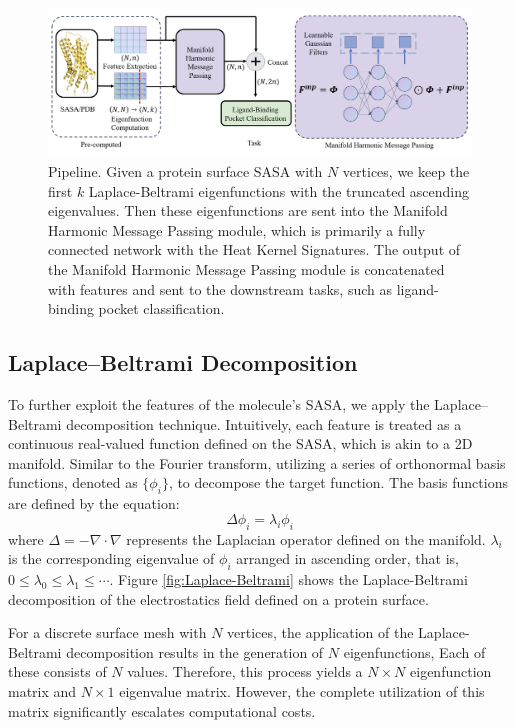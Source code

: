 \begin{figure}
    \centering
    \includegraphics[width=\linewidth]{figures/pipeline.jpg}
    \caption{
        Pipeline.
        Given a protein surface SASA with $N$ vertices, we keep the first $k$ Laplace-Beltrami eigenfunctions with the truncated ascending eigenvalues.
        Then these eigenfunctions are sent into the Manifold Harmonic Message Passing module, which is primarily a fully connected network with the Heat Kernel Signatures.
        The output of the Manifold Harmonic Message Passing module is concatenated with features and sent to the downstream tasks, such as ligand-binding pocket classification.
    }
    \label{fig:pipeline}
\end{figure}

\subsection{Laplace–Beltrami Decomposition}

To further exploit the features of the molecule's SASA, we apply the Laplace–Beltrami decomposition technique.
Intuitively, each feature is treated as a continuous real-valued function defined on the SASA, which is akin to a 2D manifold.
Similar to the Fourier transform, utilizing a series of orthonormal basis functions, denoted as $\{\phi_i\}$, to decompose the target function.
The basis functions are defined by the equation:
\begin{equation}
    \Delta\phi_i=\lambda_i\phi_i
\end{equation}
where $\Delta=-\nabla\cdot\nabla$ represents the Laplacian operator defined on the manifold.
$\lambda_i$ is the corresponding eigenvalue of $\phi_i$ arranged in ascending order, that is, $0\le\lambda_0\le\lambda_1\le\cdots$.
Figure \ref{fig:Laplace-Beltrami} shows the Laplace-Beltrami decomposition of the electrostatics field defined on a protein surface.

For a discrete surface mesh with $N$ vertices, the application of the Laplace-Beltrami decomposition results in the generation of $N$ eigenfunctions,
Each of these consists of $N$ values.
Therefore, this process yields a $N\times N$ eigenfunction matrix and $N\times 1$ eigenvalue matrix.
However, the complete utilization of this matrix significantly escalates computational costs.

